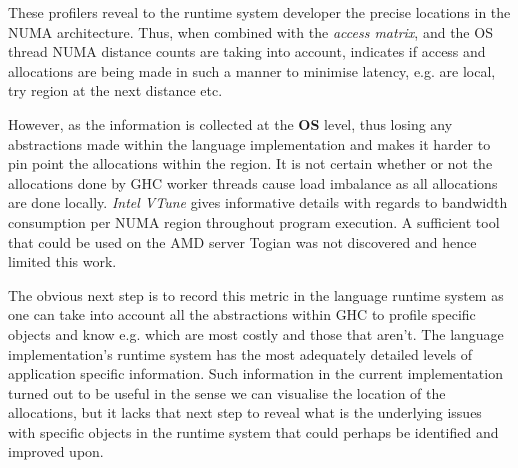 \documentclass{paper}\usepackage{graphicx}
\begin{document}



These profilers reveal to the runtime system developer the precise locations in the NUMA architecture. Thus, when combined with the \textit{access matrix}, and the OS thread NUMA distance counts are taking into account, indicates if access and allocations are being made in such a manner to minimise latency, e.g. are local, try region at the next distance etc.

However, as the information is collected at the \textbf{OS} level, thus losing any abstractions made within the language implementation and makes it harder to pin point the allocations within the region. It is not certain whether or not the allocations done by GHC worker threads cause load imbalance as all allocations are done locally. \textit{Intel VTune} gives informative details with regards to bandwidth consumption per NUMA region throughout program execution. A sufficient tool that could be used on the AMD server Togian was not discovered and hence limited this work.

The obvious next step is to record this metric in the language runtime system as one can take into account all the abstractions within GHC to profile specific objects and know e.g. which are most costly and those that aren't. The language implementation's runtime system has the most adequately detailed levels of application specific information. Such information in the current implementation turned out to be useful in the sense we can visualise the location of the allocations, but it lacks that next step to reveal what is the underlying issues with specific objects in the runtime system that could perhaps be identified and improved upon.
\end{document}
